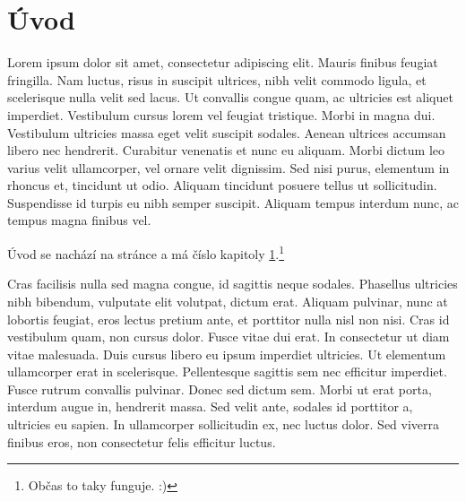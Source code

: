 \documentclass{article}
\begin{document}
\section{Úvod}
\label{sec:uvod}

Lorem ipsum dolor sit amet, consectetur adipiscing elit. Mauris finibus feugiat fringilla. Nam luctus, risus in suscipit ultrices, nibh velit commodo ligula, et scelerisque nulla velit sed lacus. Ut convallis congue quam, ac ultricies est aliquet imperdiet. Vestibulum cursus lorem vel feugiat tristique. Morbi in magna dui. Vestibulum ultricies massa eget velit suscipit sodales. Aenean ultrices accumsan libero nec hendrerit. Curabitur venenatis et nunc eu aliquam. Morbi dictum leo varius velit ullamcorper, vel ornare velit dignissim. Sed nisi purus, elementum in rhoncus et, tincidunt ut odio. Aliquam tincidunt posuere tellus ut sollicitudin. Suspendisse id turpis eu nibh semper suscipit. Aliquam tempus interdum nunc, ac tempus magna finibus vel.

Úvod se nachází na stránce \pageref{sec:uvod} a má číslo kapitoly \ref{sec:uvod}.\footnote{Občas to taky funguje. :)}

Cras facilisis nulla sed magna congue, id sagittis neque sodales. Phasellus ultricies nibh bibendum, vulputate elit volutpat, dictum erat. Aliquam pulvinar, nunc at lobortis feugiat, eros lectus pretium ante, et porttitor nulla nisl non nisi. Cras id vestibulum quam, non cursus dolor. Fusce vitae dui erat. In consectetur ut diam vitae malesuada. Duis cursus libero eu ipsum imperdiet ultricies. Ut elementum ullamcorper erat in scelerisque. Pellentesque sagittis sem nec efficitur imperdiet. Fusce rutrum convallis pulvinar. Donec sed dictum sem. Morbi ut erat porta, interdum augue in, hendrerit massa. Sed velit ante, sodales id porttitor a, ultricies eu sapien. In ullamcorper sollicitudin ex, nec luctus dolor. Sed viverra finibus eros, non consectetur felis efficitur luctus.
\end{document}
